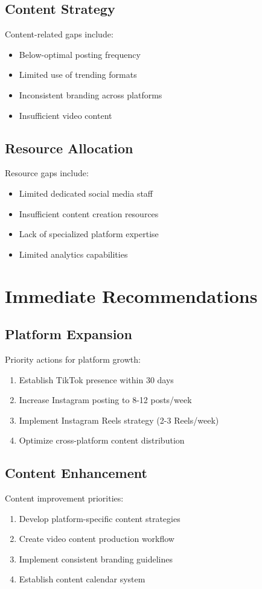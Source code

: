 \documentclass[12pt]{report}
\begin{document}
\subsection{Content Strategy}
Content-related gaps include:
\begin{itemize}
    \item Below-optimal posting frequency
    \item Limited use of trending formats
    \item Inconsistent branding across platforms
    \item Insufficient video content
\end{itemize}

\subsection{Resource Allocation}
Resource gaps include:
\begin{itemize}
    \item Limited dedicated social media staff
    \item Insufficient content creation resources
    \item Lack of specialized platform expertise
    \item Limited analytics capabilities
\end{itemize}

\section{Immediate Recommendations}
\subsection{Platform Expansion}
Priority actions for platform growth:
\begin{enumerate}
    \item Establish TikTok presence within 30 days
    \item Increase Instagram posting to 8-12 posts/week
    \item Implement Instagram Reels strategy (2-3 Reels/week)
    \item Optimize cross-platform content distribution
\end{enumerate}

\subsection{Content Enhancement}
Content improvement priorities:
\begin{enumerate}
    \item Develop platform-specific content strategies
    \item Create video content production workflow
    \item Implement consistent branding guidelines
    \item Establish content calendar system
\end{enumerate}
\end{document}
